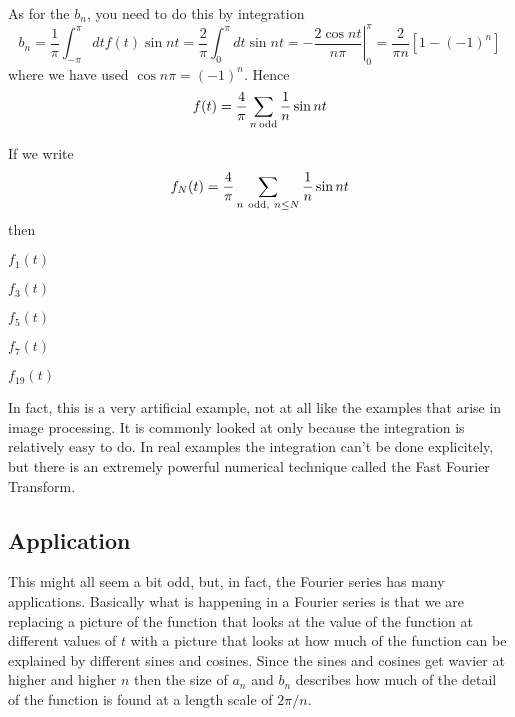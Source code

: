 \documentclass[12pt]{article}
\begin{document}
As for the $b_n$, you need to do this by integration
\begin{equation}
b_n=\frac{1}{\pi}\int_{-\pi}^{\pi}dt f(t)\sin{nt}=\frac{2}{\pi}\int_0^{\pi}dt \sin{nt}=-\left.\frac{2\cos{nt}}{n\pi}\right|_0^\pi=\frac{2}{\pi n}[1-(-1)^n]
\end{equation}
where we have used $\cos{n\pi}=(-1)^n$. Hence
\begin{equation}
f(t)=\frac{4}{\pi}\sum_{n\mbox{\,{\scriptsize odd}}}{\frac{1}{n}\sin{nt}}
\end{equation}

If we write
\begin{equation}
f_N(t)=\frac{4}{\pi}\sum_{n\mbox{ {\scriptsize odd,} }n\le N}\frac{1}{n}\sin{nt}
\end{equation}
then
\begin{center}
$f_1(t)$
\end{center}

\begin{center}
$f_3(t)$
\end{center}


\begin{center}
$f_5(t)$
\end{center}


\begin{center}
$f_7(t)$
\end{center}


\begin{center}
$f_{19}(t)$
\end{center}

In fact, this is a very artificial example, not at all like the
examples that arise in image processing. It is commonly looked at only
because the integration is relatively easy to do. In real examples the
integration can't be done explicitely, but there is an extremely
powerful numerical technique called the Fast Fourier Transform.

\subsection*{Application}

This might all seem a bit odd, but, in fact, the Fourier series has
many applications. Basically what is happening in a Fourier series is
that we are replacing a picture of the function that looks at the
value of the function at different values of $t$ with a picture that
looks at how much of the function can be explained by different sines
and cosines. Since the sines and cosines get wavier at higher and
higher $n$ then the size of $a_n$ and $b_n$ describes how much of the
detail of the function is found at a length scale of $2\pi/n$.
\end{document}

